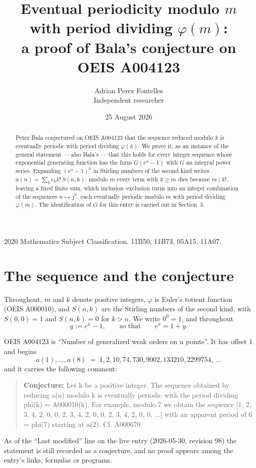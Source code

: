 \documentclass[11pt,a4paper]{article}
\title{Eventual periodicity modulo $m$ with period dividing $\varphi(m)$:\\a proof of Bala's conjecture on OEIS A004123}
\author{Adrian Perez Fontelles\\ \small Independent researcher}
\date{25 August 2026}
\theoremstyle{plain}
\theoremstyle{definition}
\begin{document}
\maketitle

\begin{abstract}
Peter Bala conjectured on OEIS A004123 that the sequence reduced modulo $k$ is eventually periodic with period dividing $\varphi(k)$. We prove it, as an instance of the general statement --- also Bala's --- that this holds for every integer sequence whose exponential generating function has the form $G(e^{x}-1)$ with $G$ an integral power series. Expanding $(e^{x}-1)^{k}$ in Stirling numbers of the second kind writes $a(n)=\sum_{k}c_{k}k!\,S(n,k)$; modulo $m$ every term with $k\ge m$ dies because $m\mid k!$, leaving a fixed finite sum, which inclusion--exclusion turns into an integer combination of the sequences $n\mapsto j^{n}$, each eventually periodic modulo $m$ with period dividing $\varphi(m)$. The identification of $G$ for this entry is carried out in Section~3.
\end{abstract}

\noindent\small 2020 Mathematics Subject Classification. 11B50, 11B73, 05A15, 11A07.\normalsize

\section{The sequence and the conjecture}

Throughout, $m$ and $k$ denote positive integers, $\varphi$ is Euler's totient function
(OEIS A000010), and $S(n,k)$ are the Stirling numbers of the second kind, with
$S(0,0)=1$ and $S(n,k)=0$ for $k>n$. We write $0^{0}=1$, and throughout
\[
y := e^{x}-1, \qquad\text{so that}\qquad e^{x}=1+y .
\]

OEIS A004123 is ``Number of generalized weak orders on n points''. It has offset $1$ and begins
\[
a(1),\dots,a(8)\;=\;1, 2, 10, 74, 730, 9002, 133210, 2299754,\ \dots
\]
and it carries the following comment:
\begin{quote}\small
\textbf{Conjecture:} Let k be a positive integer. The sequence obtained by reducing a(n) modulo k is eventually periodic with the period dividing phi(k) = A000010(k). For example, modulo 7 we obtain the sequence [1, 2, 3, 4, 2, 0, 0, 2, 3, 4, 2, 0, 0, 2, 3, 4, 2, 0, 0, ...] with an apparent period of 6 = phi(7) starting at a(2). Cf. A000670.
\end{quote}
As of the ``Last modified'' line on the live entry (2026-05-30, revision 98) the
statement is still recorded as a conjecture, and no proof appears among the entry's links,
formulas or programs.
\end{document}
